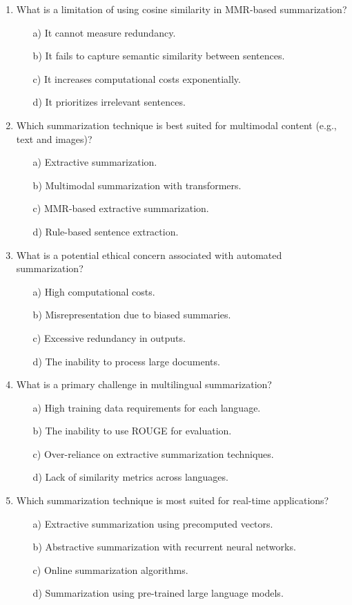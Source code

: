 \documentclass[8pt]{extarticle}
\begin{document}
\begin{multicols}{2}
\begin{enumerate}
\item What is a limitation of using cosine similarity in MMR-based summarization?
\begin{itemize}
\item[a)] It cannot measure redundancy.
\item[b)] It fails to capture semantic similarity between sentences.
\item[c)] It increases computational costs exponentially.
\item[d)] It prioritizes irrelevant sentences.
\end{itemize}


\item Which summarization technique is best suited for multimodal content (e.g., text and images)?
\begin{itemize}
\item[a)] Extractive summarization.
\item[b)] Multimodal summarization with transformers.
\item[c)] MMR-based extractive summarization.
\item[d)] Rule-based sentence extraction.
\end{itemize}


\item What is a potential ethical concern associated with automated summarization?
\begin{itemize}
\item[a)] High computational costs.
\item[b)] Misrepresentation due to biased summaries.
\item[c)] Excessive redundancy in outputs.
\item[d)] The inability to process large documents.
\end{itemize}


\item What is a primary challenge in multilingual summarization?
\begin{itemize}
\item[a)] High training data requirements for each language.
\item[b)] The inability to use ROUGE for evaluation.
\item[c)] Over-reliance on extractive summarization techniques.
\item[d)] Lack of similarity metrics across languages.
\end{itemize}


\item Which summarization technique is most suited for real-time applications?
\begin{itemize}
\item[a)] Extractive summarization using precomputed vectors.
\item[b)] Abstractive summarization with recurrent neural networks.
\item[c)] Online summarization algorithms.
\item[d)] Summarization using pre-trained large language models.
\end{itemize}



\end{enumerate}
\end{multicols}
\end{document}
